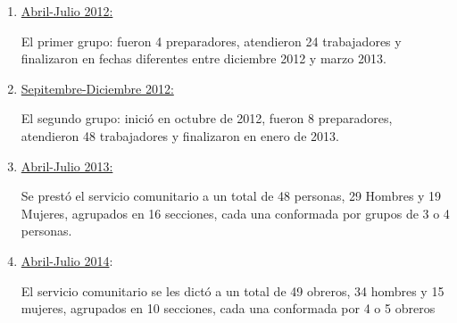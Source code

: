             \begin{enumerate}
                \item \underline{Abril-Julio 2012:} 
                
                El primer grupo: fueron 4 preparadores, atendieron 24 trabajadores y finalizaron en fechas diferentes entre diciembre 2012 y marzo 2013.
                
                \item \underline{Sepitembre-Diciembre 2012:}
                
                El segundo grupo: inició en octubre de 2012, fueron 8 preparadores, atendieron 48 trabajadores y finalizaron en enero de 2013.
                
                \item \underline{Abril-Julio 2013:}
                
                Se prestó el servicio comunitario a un total de 48 personas, 29  Hombres y 19 Mujeres,  agrupados en 16 secciones, cada una conformada por grupos de 3 o 4 personas.
               
                \item \underline{Abril-Julio 2014}:
                
                El servicio comunitario se les dictó a un total de 49 obreros, 34 hombres y 15 mujeres, agrupados en 10 secciones, cada una conformada por 4 o 5 obreros
                
                
                
                
                
                
                
            \end{enumerate}
            
	\pagebreak